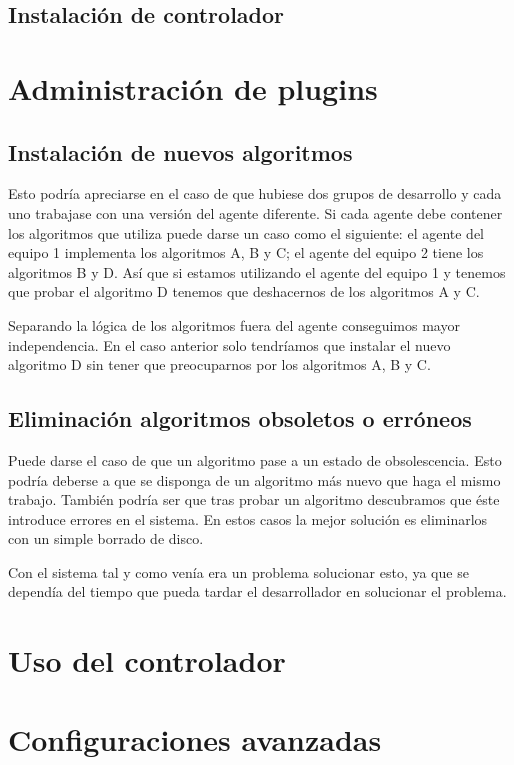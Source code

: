 \subsection{Instalación de controlador}

\section{Administración de plugins}

\subsection{Instalación de nuevos algoritmos}

Esto podría apreciarse en el caso de que hubiese dos grupos de desarrollo y cada uno trabajase con una versión del agente diferente. Si cada agente debe contener los algoritmos que utiliza puede darse un caso como el siguiente: el agente del equipo 1 implementa los algoritmos A, B y C; el agente del equipo 2 tiene los algoritmos B y D. Así que si estamos utilizando el agente del equipo 1 y tenemos que probar el algoritmo D tenemos que deshacernos de los algoritmos A y C.

Separando la lógica de los algoritmos fuera del agente conseguimos mayor independencia. En el caso anterior solo tendríamos que instalar el nuevo algoritmo D sin tener que preocuparnos por los algoritmos A, B y C.

\subsection{Eliminación algoritmos obsoletos o erróneos}

Puede darse el caso de que un algoritmo pase a un estado de obsolescencia. Esto podría deberse a que se disponga de un algoritmo más nuevo que haga el mismo trabajo. También podría ser que tras probar un algoritmo descubramos que éste introduce errores en el sistema. En estos casos la mejor solución es eliminarlos con un simple borrado de disco.

Con el sistema tal y como venía era un problema solucionar esto, ya que se dependía del tiempo que pueda tardar el desarrollador en solucionar el problema.

\section{Uso del controlador}

\section{Configuraciones avanzadas}\label{sec:conf_avanzada}

